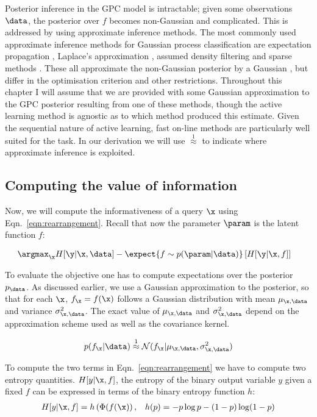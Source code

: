 Posterior inference in the GPC model is intractable; given some observations $\data$, the posterior over $f$ becomes non-Gaussian and complicated. This is addressed by using approximate inference methods. The most commonly used approximate inference methods for Gaussian process classification are expectation propagation \citep[EP,][]{Minka2002}, Laplace's approximation \citep{williams1998}, assumed density filtering \citep[ADF,][]{csato2000} and sparse methods \citep{candela05sparseGP}. These all approximate the non-Gaussian posterior by a Gaussian \citep{Nickisch2008}, but differ in the optimisation criterion and other restrictions. Throughout this chapter I will assume that we are provided with some Gaussian approximation to the GPC posterior resulting from one of these methods, though the active learning method is agnostic as to which method produced this estimate. Given the sequential nature of active learning, fast on-line methods \citep{Csato2002} are particularly well suited for the task. In our derivation we will use {\scriptsize$\stackrel{1}{\approx}$} to indicate where approximate inference is exploited.

\subsection{Computing the value of information}

Now, we will compute the informativeness of a query $\x$ using Eqn.\  \eqref{eqn:rearrangement}. Recall that now the parameter $\param$ is the latent function $f$:

\begin{align}
	&\argmax_{\x} H[\y \vert \x, \data] - \expect{f\sim p(\param|\data)} \left[ H[\y \vert \x,f] \right]
\end{align}

To evaluate the objective one has to compute expectations over the posterior $p_\data$. As discussed earlier, we use a Gaussian approximation to the posterior, so that for each $\x$, $f_{\x} = f(\x)$ follows a Gaussian distribution with mean $\mu_{\x,\data}$ and variance $\sigma_{\x,\data}^2$. The exact value of $\mu_{\x,\data}$ and $\sigma_{\x,\data}^2$ depend on the approximation scheme used as well as the covariance kernel.

\begin{align}
	p(f_{\x}\vert\data) \stackrel{1}{\approx} \mathcal{N}(f_{\x}\vert \mu_{\x,\data},\sigma_{\x,\data}^2) 
\end{align}

To compute the two terms in Eqn.\ \eqref{eqn:rearrangement} we have to compute two entropy quantities. $H[y\vert\x,f]$, the entropy of the binary output variable $y$ given a fixed $f$ can be expressed in terms of the binary entropy function $h$: 
\begin{align}
H[y\vert\x,f] = h\left(\Phi(f(\x)\right), && h(p)=- p\log p - (1-p)\log(1-p)
\end{align}

